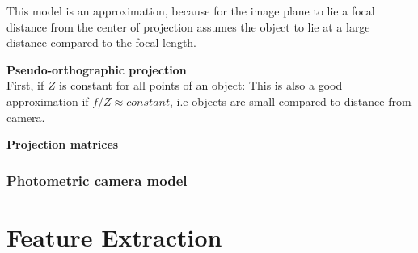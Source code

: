 \documentclass[a4paper, fontsize=8pt, landscape, DIV=1]{scrartcl}
\begin{document}
\begin{multicols*}{4}
		This model is an approximation, because for the image plane to lie a focal distance from the center of projection assumes the object to lie at a large distance compared to the focal length.
		\par 
		\textbf{Pseudo-orthographic projection}\\
		First, if $Z$ is constant for all points of an object:
		This is also a good approximation if $f/Z\approx constant$, i.e objects are small compared to distance from camera.
		\par 
		\textbf{Projection matrices}\\
		
		 
		\subsubsection{Photometric camera model}
		\section{Feature Extraction}	
		
		 
		
	\end{multicols*}
	\setcounter{secnumdepth}{3}
\end{document}
